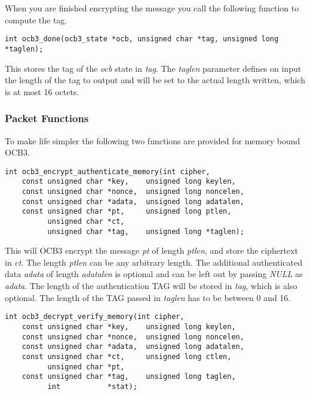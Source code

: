 \documentclass[synpaper]{book}
\begin{document}
When you are finished encrypting the message you call the following function to compute the tag.

\begin{verbatim}
int ocb3_done(ocb3_state *ocb, unsigned char *tag, unsigned long *taglen);
\end{verbatim}

This stores the tag of the \textit{ocb} state in \textit{tag}.
The \textit{taglen} parameter defines on input the length of the tag to output and will be set to the actual length written, which
is at most 16 octets.

\subsubsection{Packet Functions}
To make life simpler the following two functions are provided for memory bound OCB3.

\begin{verbatim}
int ocb3_encrypt_authenticate_memory(int cipher,
    const unsigned char *key,    unsigned long keylen,
    const unsigned char *nonce,  unsigned long noncelen,
    const unsigned char *adata,  unsigned long adatalen,
    const unsigned char *pt,     unsigned long ptlen,
          unsigned char *ct,
          unsigned char *tag,    unsigned long *taglen);
\end{verbatim}

This will OCB3 encrypt the message \textit{pt} of length \textit{ptlen}, and store the ciphertext in \textit{ct}.  The length \textit{ptlen}
can be any arbitrary length.  The additional authenticated data \textit{adata} of length \textit{adatalen} is optional and can be left out
by passing \textit{NULL} as \textit{adata}. The length of the authentication TAG will be stored in \textit{tag}, which is also optional.
The length of the TAG passed in \textit{taglen} has to be between 0 and 16.

\begin{verbatim}
int ocb3_decrypt_verify_memory(int cipher,
    const unsigned char *key,    unsigned long keylen,
    const unsigned char *nonce,  unsigned long noncelen,
    const unsigned char *adata,  unsigned long adatalen,
    const unsigned char *ct,     unsigned long ctlen,
          unsigned char *pt,
    const unsigned char *tag,    unsigned long taglen,
          int           *stat);
\end{verbatim}
\end{document}
